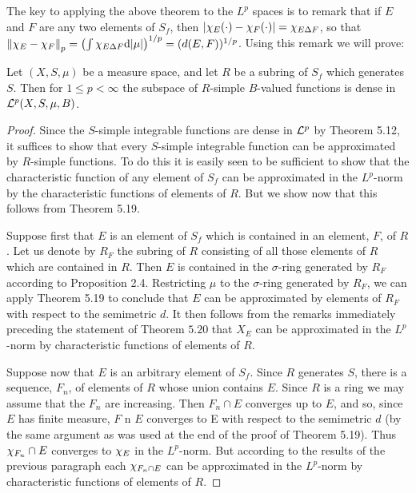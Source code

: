 The key to applying the above theorem to the $L^p$ spaces is to remark that if $E$ and $F$ are any two elements of $S_f$, then $|\chi_{E}(\cdot)-\chi_{F}(\cdot)|=\chi_{E\Delta F}$, so that $\norm{\chi_{E}-\chi_{F}}_p=\left(\int\chi_{E\Delta F}\dd|\mu|\right)^{1/p}=(d(E,F))^{1/p}$. Using this remark we will prove:

\begin{theorem}
Let $(X,S,\mu)$ be a measure space, and let $R$ be a subring of $S_f$ which generates $S$. Then for $1\leq p<\infty$ the subspace of $R$-simple $B$-valued functions is dense in ${\cal L}^p(X,S,\mu,B)$.
\end{theorem}

\begin{proof}
Since the $S$-simple integrable functions are dense in ${\cal L}^p$ by Theorem 5.12, it suffices to show that every $S$-simple integrable function can be approximated by $R$-simple functions. To do this it is easily seen to be sufficient to show that the characteristic function of any element of $S_f$ can be approximated in the $L^p$-norm by the characteristic functions of elements of $R$. But we show now that this follows from Theorem 5.19.

Suppose first that $E$ is an element of $S_f$ which is contained in an element, $F$, of $R$. Let us denote by $R_F$ the subring of $R$ consisting of all those elements of $R$ which are contained in $R$. Then $E$ is contained in the $\sigma$-ring generated by $R_F$ according to Proposition 2.4. Restricting $\mu$ to the $\sigma$-ring generated by $R_F$, we can apply Theorem 5.19 to conclude that $E$ can be approximated by elements of $R_F$ with respect to the semimetric $d$. It then follows from the remarks immediately preceding the statement of Theorem $5.20$ that $X_E$ can be approximated in the $L^p$-norm by characteristic functions of elements of $R$.

Suppose now that $E$ is an arbitrary element of $S_f$. Since $R$ generates $S$, there is a sequence, $F_n$, of elements of $R$ whose union contains $E$. Since $R$ is a ring we may assume that the $F_n$ are increasing. Then $F_n\cap E$ converges up to $E$, and so, since $E$ has finite measure, $F$ n $E$ converges to E with respect to the semimetric $d$ (by the same argument as was used at the end of the proof of Theorem 5.19). Thus $\chi_{F_n}\cap E$ converges to $\chi_{E}$ in the $L^p$-norm. But according to the results of the previous paragraph each $\chi_{F_n\cap E}$ can be approximated in the $L^p$-norm by characteristic functions of elements of $R$.
\end{proof}

